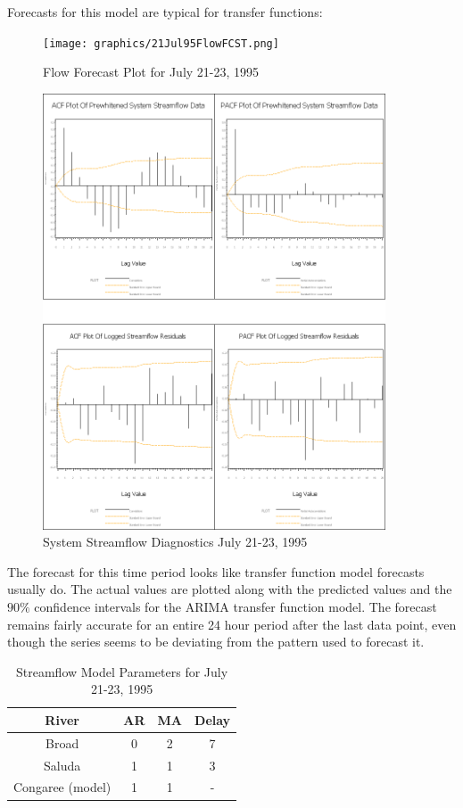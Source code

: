 \documentclass[12pt]{report}
\begin{document}
Forecasts for this model are typical for transfer functions:

\begin{figure}[h]
\centering\texttt{[image: graphics/21Jul95FlowFCST.png]}
\centering\caption{Flow Forecast Plot for July 21-23, 1995}
\end{figure}


\begin{figure}[h]
\centering\includegraphics[width=4in]{prodgraph/23Juldiag.png}
\centering\caption{System Streamflow Diagnostics July 21-23,
1995}\label{fig:julfsysapcf}
\end{figure}

The forecast for this time period looks like transfer function
model forecasts usually do.  The actual values are plotted along
with the predicted values and the $90\%$ confidence intervals for
the ARIMA transfer function model.  The forecast remains fairly
accurate for an entire 24 hour period after the last data point,
even though the series seems to be deviating from the pattern used
to forecast it.

\begin{table}[h]
\begin{centering}\begin{tabular}{|c|c|c|c|}
\hline \textbf{River} & \textbf{AR} & \textbf{MA} & \textbf{Delay} \\
\hline Broad & 0 & 2 & 7 \\
Saluda & 1 & 1 & 3 \\
Congaree (model) & 1 & 1 & - \\
\hline
\end{tabular}\caption{Streamflow Model Parameters for July 21-23, 1995}
\end{centering}\end{table}
\end{document}
